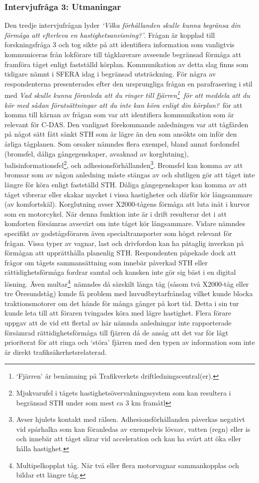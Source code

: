 \subsubsection{Intervjufråga 3: Utmaningar}
Den tredje intervjufrågan lyder \emph{\lq{}Vilka förhållanden skulle kunna begränsa din förmåga att efterleva en hastighetsanvisning?\rq{}}.
Frågan är kopplad till forskningsfråga 3 och tog sikte på att identifiera information som vanligtvis kommuniceras från lokförare till tågklarerare avseende begränsad förmåga att framföra tåget enligt fastställd körplan.
Kommunikation av detta slag finns som tidigare nämnt i SFERA idag i begränsad utsträckning.
För några av respondenterna presenterades efter den ursprungliga frågan en parafrasering i stil med \emph{Vad skulle kunna föranleda att du ringer till fjärren\footnote{\lq{}Fjärren\rq{} är benämning på Trafikverkets driftledningscentral(er).}~för att meddela att du kör med sådan förutsättningar att du inte kan köra enligt din körplan?}~för att komma till kärnan av frågan som var att identifiera kommunikation som är relevant för C-DAS\@.
Den vanligast förekommande anledningen var att tågfärden på något sätt fått sänkt STH som är lägre än den som ansökts om inför den årliga tågplanen.
Som orsaker nämndes flera exempel, bland annat fordonsfel (bromsfel, dåliga gångegenskaper, avsaknad av korglutning), balisinformationsfel\footnote{Mjukvarufel i tågets hastighetsövervakningssystem som kan resultera i begränsad STH under som mest ca 3 km framåtl}, och adhesionsförhållanden\footnote{Avser hjulets kontakt med rälsen. Adhesionsförhållanden påverkas negativt vid spårhalka som kan föranledas av exempelvis lövsav, vatten (regn) eller is och innebär att tåget slirar vid acceleration och kan ha svårt att öka eller hålla hastighet.}.
Bromsfel kan komma av att bromsar som av någon anledning måste stängas av och slutligen gör att tåget inte längre för köra enligt fastställd STH\@.
Dåliga gångegenskaper kan komma av att tåget vibrerar eller skakar mycket i vissa hastigheter och därför kör långsammare (av komfortskäl).
Korglutning avser X2000-tågens förmåga att luta inåt i kurvor som en motorcykel.
När denna funktion inte är i drift resulterar det i att komforten försämras avsevärt om inte tåget kör långsammare.
Vidare nämndes specifikt av godstågsföraren även specialtransporter som högst relevant för frågan.
Vissa typer av vagnar, last och drivfordon kan ha påtaglig inverkan på förmågan att upprätthålla planenlig STH\@.
Respondenten påpekade dock att frågor om tågets sammansättning som innebär påverkad STH eller rättidighetsförmåga fordrar samtal och kansken inte gör sig bäst i en digital lösning.
Även multar\footnote{Multipelkopplat tåg. När två eller flera motorvagnar sammankopplas och bildar ett längre tåg.}~nämndes då särskilt långa tåg (såsom två X2000-tåg eller tre Öresundståg) kunde få problem med huvudbrytarfrånslag vilket kunde blocka traktionsmotorer om det hände för många gånger på kort tid.
Detta i sin tur kunde leta till att föraren tvingades köra med lägre hastighet.
Flera förare uppgav att de vid ett flertal av här nämnda anledningar inte rapporterade försämrad rättidighetsförmåga till fjärren då de ansåg att det var för lågt prioriterat för att ringa och \lq{}störa\rq{} fjärren med den typen av information som inte är direkt trafiksäkerhetsrelaterad.
